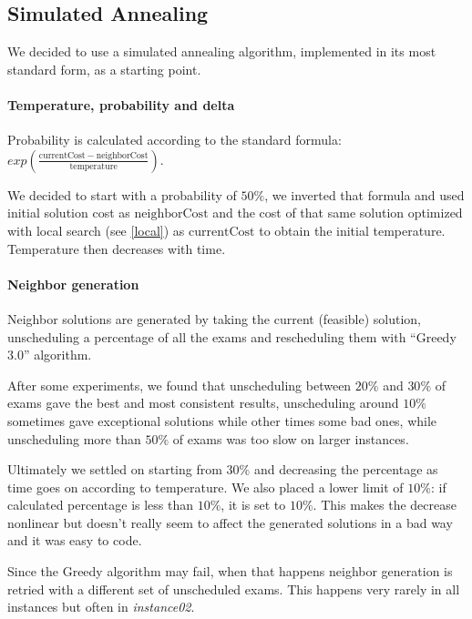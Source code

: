 \documentclass[11pt, a4paper, leqno]{article}
\begin{document}
	\subsection{Simulated Annealing}
	
	We decided to use a simulated annealing algorithm, implemented in its most standard form, as a starting point.
	
	\paragraph{Temperature, probability and delta}
	
	Probability is calculated according to the standard formula: $exp\left(\frac{\mathrm{currentCost}-\mathrm{neighborCost}}{\mathrm{temperature}}\right)$.
	
	We decided to start with a probability of $50\%$, we inverted that formula and used initial solution cost as $\mathrm{neighborCost}$ and the cost of that same solution optimized with local search (see \ref{local}) as $\mathrm{currentCost}$ to obtain the initial temperature. Temperature then decreases with time.
	
	\paragraph{Neighbor generation}
	\label{neighbors}
	
	Neighbor solutions are generated by taking the current (feasible) solution, unscheduling a percentage of all the exams and rescheduling them with ``Greedy 3.0'' algorithm.
	
	After some experiments, we found that unscheduling between $20\%$ and $30\%$ of exams gave the best and most consistent results, unscheduling around $10\%$ sometimes gave exceptional solutions while other times some bad ones, while unscheduling more than $50\%$ of exams was too slow on larger instances.
	
	Ultimately we settled on starting from $30\%$ and decreasing the percentage as time goes on according to temperature. We also placed a lower limit of $10\%$: if calculated percentage is less than $10\%$, it is set to $10\%$. This makes the decrease nonlinear but doesn't really seem to affect the generated solutions in a bad way and it was easy to code.
	
	Since the Greedy algorithm may fail, when that happens neighbor generation is retried with a different set of unscheduled exams. This happens very rarely in all instances but often in \textit{instance02}.
	
\end{document}
